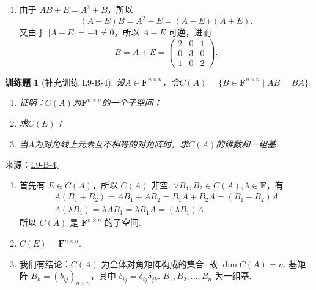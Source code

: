 \documentclass[12pt,fontset=fandol]{ctexart}
\newtheorem{exercise}{训练题}[section]
\begin{document}
\begin{solve}
\begin{enumerate}
                \item 由于 $ AB + E = A^2 + B $，所以
                      \[ (A - E)B = A^2 - E = (A - E)(A + E). \]
                      又由于 $ |A - E| = -1 \neq 0 $，所以 $ A - E $ 可逆，进而
                      \[ B = A + E = \begin{pmatrix}
                              2 & 0 & 1 \\
                              0 & 3 & 0 \\
                              1 & 0 & 2
                          \end{pmatrix}. \]
            \end{enumerate}
\end{solve}

\begin{exercise}[补充训练 L9-B-4]\label{prob:L9-B-4}
设$A \in \mathbf{F}^{n \times n}$，令$C(A)=\{B \in \mathbf{F}^{n \times n} \mid AB=BA\}$.
        \begin{enumerate}
            \item 证明：$C(A)$为$\mathbf{F}^{n \times n}$的一个子空间；

            \item 求$C(E)$；

            \item 当$A$为对角线上元素互不相等的对角阵时，求$C(A)$的维数和一组基.
        \end{enumerate}
\end{exercise}
\noindent 来源：\href{https://github.com/yhwu-is/Linear-Algebra-Left-Undone/blob/new/%E8%AE%B2%E4%B9%89/%E4%B8%93%E9%A2%98/9%20%E7%9F%A9%E9%98%B5%E8%BF%90%E7%AE%97%E8%BF%9B%E9%98%B6.tex}{L9-B-4}。
\begin{solve}
\begin{enumerate}
                \item 首先有 $ E \in C(A) $，所以 $ C(A) $ 非空. $ \forall B_1, B_2 \in C(A), \lambda \in \mathbf{F} $，有
                      \begin{gather*}
                          A(B_1 + B_2) = AB_1 + AB_2 = B_1A + B_2A = (B_1 + B_2)A \\
                          A(\lambda B_1) = \lambda AB_1 = \lambda B_1A = (\lambda B_1)A.
                      \end{gather*}
                      所以 $ C(A) $ 是 $ \mathbf{F}^{n \times n} $ 的子空间.

                \item $ C(E) = \mathbf{F}^{n \times n} $.

                \item 我们有结论：$ C(A) $ 为全体对角矩阵构成的集合. 故 $ \dim C(A) = n $. 基矩阵 $ B_k = (b_{ij})_{n \times n} $，其中 $ b_{ij} = \delta_{ij} \delta_{jk} $. $ B_1, B_2, \ldots, B_n $ 为一组基.
            \end{enumerate}
\end{solve}
\end{document}
